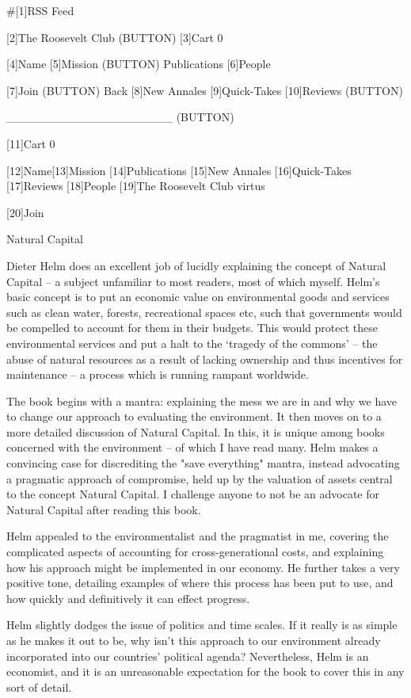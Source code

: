    #[1]RSS Feed

   [2]The Roosevelt Club
   (BUTTON)
   [3]Cart 0

   [4]Name [5]Mission (BUTTON) Publications [6]People

   [7]Join
   (BUTTON) Back [8]New Annales [9]Quick-Takes [10]Reviews
   (BUTTON)

   ____________________ (BUTTON)

   [11]Cart 0

   [12]Name[13]Mission [14]Publications [15]New Annales [16]Quick-Takes
   [17]Reviews [18]People
   [19]The Roosevelt Club
   virtus

   [20]Join

Natural Capital


   Dieter Helm does an excellent job of lucidly explaining the concept of
   Natural Capital -- a subject unfamiliar to most readers, most of which
   myself. Helm's basic concept is to put an economic value on
   environmental goods and services such as clean water, forests,
   recreational spaces etc, such that governments would be compelled to
   account for them in their budgets. This would protect these
   environmental services and put a halt to the `tragedy of the commons'
   -- the abuse of natural resources as a result of lacking ownership and
   thus incentives for maintenance -- a process which is running rampant
   worldwide.

   The book begins with a mantra: explaining the mess we are in and why we
   have to change our approach to evaluating the environment. It then
   moves on to a more detailed discussion of Natural Capital. In this, it
   is unique among books concerned with the environment -- of which I have
   read many. Helm makes a convincing case for discrediting the "save
   everything" mantra, instead advocating a pragmatic approach of
   compromise, held up by the valuation of assets central to the concept
   Natural Capital. I challenge anyone to not be an advocate for Natural
   Capital after reading this book.

   Helm appealed to the environmentalist and the pragmatist in me,
   covering the complicated aspects of accounting for cross-generational
   costs, and explaining how his approach might be implemented in our
   economy. He further takes a very positive tone, detailing examples of
   where this process has been put to use, and how quickly and
   definitively it can effect progress.

   Helm slightly dodges the issue of politics and time scales. If it
   really is as simple as he makes it out to be, why isn't this approach
   to our environment already incorporated into our countries' political
   agenda? Nevertheless, Helm is an economist, and it is an unreasonable
   expectation for the book to cover this in any sort of detail.

